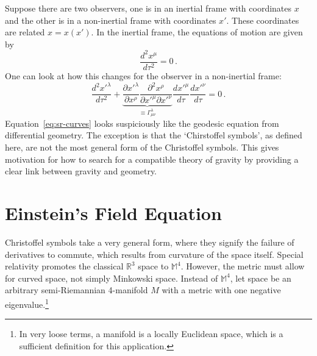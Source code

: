 Suppose there are two observers, one is in an inertial frame with coordinates $x$ and the other is in a non-inertial frame with coordinates $x'$. These coordinates are related $x = x(x')$. In the inertial frame, the equations of motion are given by 
\begin{equation}
    \frac{d^2x^\mu}{d\tau^2} = 0\,.
\end{equation} 
One can look at how this changes for the observer in a non-inertial frame:
\begin{equation}\label{eq:sr-curves}
    \frac{d^2x'^\lambda}{d\tau^2}+\underbrace{\frac{\partial x'^\lambda}{\partial x^\rho}\frac{\partial^2 x^\rho}{\partial x'^\mu \partial x'^\nu}}_{\equiv \Gamma_{\mu\nu}^\lambda} \frac{d x'^\mu}{d \tau} \frac{d x'^\nu}{d \tau} = 0\,.
\end{equation}
Equation~\ref{eq:sr-curves} looks suspiciously like the geodesic equation from differential geometry. The exception is that the `Chirstoffel symbols', as defined here, are not the most general form of the Christoffel symbols. This gives motivation for how to search for a compatible theory of gravity by providing a clear link between gravity and geometry. 
\section{Einstein's Field Equation}
Christoffel symbols take a very general form, where they signify the failure of derivatives to commute, which results from curvature of the space itself. Special relativity promotes the classical $\mathbb{R}^3$ space to $\mathbb{M}^4$. However, the metric must allow for curved space, not simply Minkowski space. Instead of $\mathbb{M}^4$, let space be an arbitrary semi-Riemannian 4-manifold $M$ with a metric with one negative eigenvalue.\footnote{In very loose terms, a manifold is a locally Euclidean space, which is a sufficient definition for this application.}

